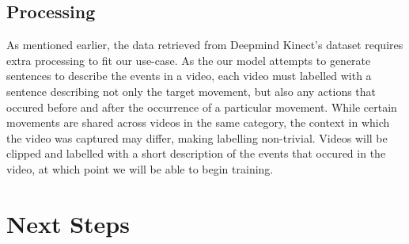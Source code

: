 \documentclass[11pt]{article}
\begin{document}
\subsection{Processing}
As mentioned earlier, the data retrieved from Deepmind Kinect's dataset requires extra processing to fit our use-case.
As the our model attempts to generate sentences to describe
the events in a video, each video must labelled with a sentence describing not only the target movement, but also
any actions that occured before and after the occurrence of a particular movement. While certain movements are shared
across videos in the same category, the context in which the video was captured may differ, making labelling non-trivial.
Videos will be clipped and labelled with a short description of the events that occured in the video, at which point we will be able
to begin training.

\section{Next Steps}
\end{document}

